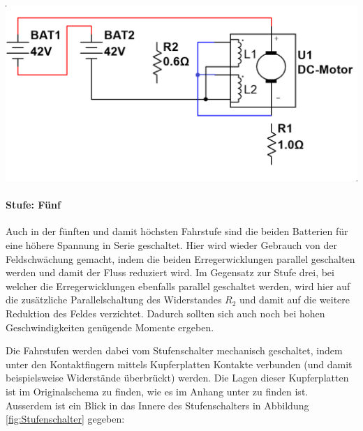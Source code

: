 \begin{minipage}{0.49\textwidth}
	\includegraphics[width=\columnwidth]{images/Stufenschalter/Stufe_5.png}%
\end{minipage}
\begin{minipage}{0.5\textwidth}
	\paragraph{Stufe: Fünf}
	Auch in der fünften und damit höchsten Fahrstufe sind die beiden Batterien für eine höhere Spannung in Serie geschaltet. Hier wird wieder Gebrauch von der Feldschwächung gemacht, indem die beiden Erregerwicklungen parallel geschalten werden und damit der Fluss reduziert wird. Im Gegensatz zur Stufe drei, bei welcher die Erregerwicklungen ebenfalls parallel geschaltet werden, wird hier auf die zusätzliche Parallelschaltung des Widerstandes $R_2$ und damit auf die weitere Reduktion des Feldes verzichtet. Dadurch sollten sich auch noch bei hohen Geschwindigkeiten genügende Momente ergeben.
\end{minipage}

Die Fahrstufen werden dabei vom Stufenschalter mechanisch geschaltet, indem unter den Kontaktfingern mittels Kupferplatten Kontakte verbunden (und damit beispielsweise Widerstände überbrückt) werden. Die Lagen dieser Kupferplatten ist im Originalschema zu finden, wie es im Anhang unter  zu finden ist. Ausserdem ist ein Blick in das Innere des Stufenschalters in Abbildung \ref{fig:Stufenschalter} gegeben: